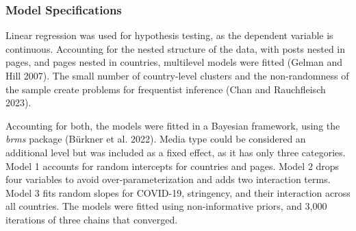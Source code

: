 \documentclass[
]{ccr}
\begin{document}
\hypertarget{model-specifications}{%
\subsubsection{Model Specifications}\label{model-specifications}}

Linear regression was used for hypothesis testing, as the dependent
variable is continuous. Accounting for the nested structure of the data,
with posts nested in pages, and pages nested in countries, multilevel
models were fitted (Gelman and Hill 2007). The small number of
country-level clusters and the non-randomness of the sample create
problems for frequentist inference (Chan and Rauchfleisch 2023).

Accounting for both, the models were fitted in a Bayesian framework,
using the \emph{brms} package (Bürkner et al. 2022). Media type could be
considered an additional level but was included as a fixed effect, as it
has only three categories. Model 1 accounts for random intercepts for
countries and pages. Model 2 drops four variables to avoid
over-parameterization and adds two interaction terms. Model 3 fits
random slopes for COVID-19, stringency, and their interaction across all
countries. The models were fitted using non-informative priors, and
3,000 iterations of three chains that converged.
\end{document}
